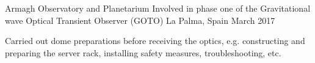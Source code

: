 \begin{cventries}
  \cventry
    {Armagh Observatory and Planetarium}
	{Involved in phase one of the Gravitational wave Optical Transient Observer (GOTO)}
    {La Palma, Spain}
    {March 2017}
    {
      \begin{cvitems}
        \item {Carried out dome preparations before receiving the optics, e.g. constructing and preparing the server rack, installing safety measures, troubleshooting, etc.}
      \end{cvitems}
    }
    
    
    
    

\end{cventries}
